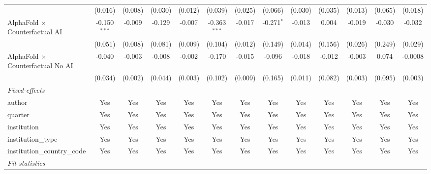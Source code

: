 \begin{tabular}{lcccccccccccc}
                                            & (0.016)        & (0.008)      & (0.030)      & (0.012) & (0.039)        & (0.025)      & (0.066)      & (0.030)     & (0.035) & (0.013) & (0.065) & (0.018)\\   
   AlphaFold $\times$ Counterfactual AI     & -0.150$^{***}$ & -0.009       & -0.129       & -0.007  & -0.363$^{***}$ & -0.017       & -0.271$^{*}$ & -0.013      & 0.004   & -0.019  & -0.030  & -0.032\\   
                                            & (0.051)        & (0.008)      & (0.081)      & (0.009) & (0.104)        & (0.012)      & (0.149)      & (0.014)     & (0.156) & (0.026) & (0.249) & (0.029)\\   
   AlphaFold $\times$ Counterfactual No AI  & -0.040         & -0.003       & -0.008       & -0.002  & -0.170         & -0.015       & -0.096       & -0.018      & -0.012  & -0.003  & 0.074   & -0.0008\\   
                                            & (0.034)        & (0.002)      & (0.044)      & (0.003) & (0.102)        & (0.009)      & (0.165)      & (0.011)     & (0.082) & (0.003) & (0.095) & (0.003)\\   
   \midrule
   \emph{Fixed-effects}\\
   author                                   & Yes            & Yes          & Yes          & Yes     & Yes            & Yes          & Yes          & Yes         & Yes     & Yes     & Yes     & Yes\\  
   quarter                                  & Yes            & Yes          & Yes          & Yes     & Yes            & Yes          & Yes          & Yes         & Yes     & Yes     & Yes     & Yes\\  
   institution                              & Yes            & Yes          & Yes          & Yes     & Yes            & Yes          & Yes          & Yes         & Yes     & Yes     & Yes     & Yes\\  
   institution\_type                        & Yes            & Yes          & Yes          & Yes     & Yes            & Yes          & Yes          & Yes         & Yes     & Yes     & Yes     & Yes\\  
   institution\_country\_code               & Yes            & Yes          & Yes          & Yes     & Yes            & Yes          & Yes          & Yes         & Yes     & Yes     & Yes     & Yes\\  
   \midrule
   \emph{Fit statistics}\\

\end{tabular}

